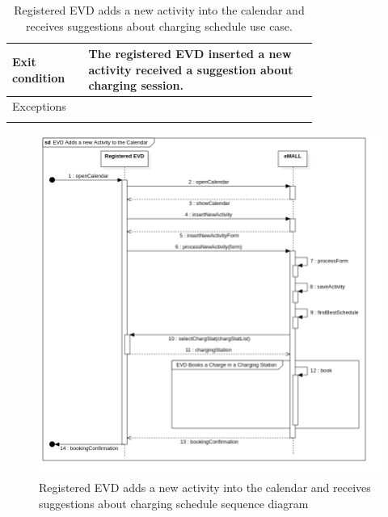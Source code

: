 \begin{center}
\begin{longtable}{lp{0.75\linewidth}}
        \hline
        Exit condition   & The registered EVD inserted a new activity received a suggestion about charging session.                             \\
        \hline
        Exceptions       &                                                                                                                      \\
        \hline
        \caption{Registered EVD adds a new activity into the calendar and receives suggestions about charging schedule use case.}
        \label{tab: EVD_adds_activity_calendar_use_case}
    \end{longtable}

    \begin{figure} [H]
        \begin{center}
            \includegraphics[width=0.8\linewidth]{Images/SequenceDiagrams/evd_adds_a_new_activity_to_the_calendar}
            \caption{Registered EVD adds a new activity into the calendar and receives suggestions about charging schedule sequence diagram}
            \label{fig: evd_adds_activity_seq_diag}
        \end{center}
    \end{figure}
\end{center}


